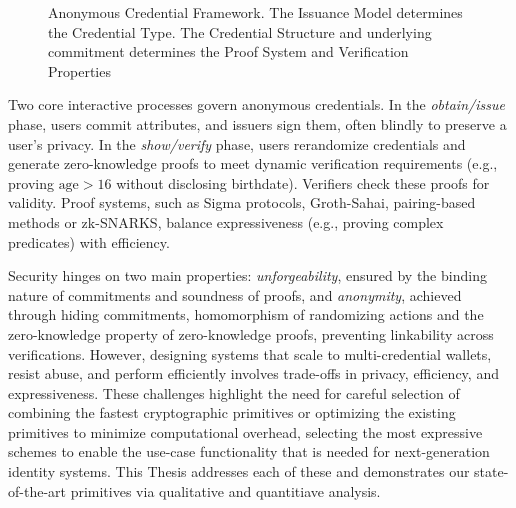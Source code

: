 \begin{figure}
        
  
    \caption[Anonymous Credential Framework Diagram]{Anonymous Credential Framework. The Issuance Model determines the Credential Type. The Credential Structure and underlying commitment determines the Proof System and Verification Properties}
    \label{fig:chap1_anon_cred_framework}
\end{figure}



Two core interactive processes govern anonymous credentials. In the \emph{obtain/issue} phase, users commit attributes, and issuers sign them, often blindly to preserve a user's privacy. In the \emph{show/verify} phase, users rerandomize credentials and generate zero-knowledge proofs to meet dynamic verification requirements (e.g., proving $ \text{age} > 16 $ without disclosing birthdate). Verifiers check these proofs for validity. Proof systems, such as Sigma protocols, Groth-Sahai, pairing-based methods or zk-SNARKS, balance expressiveness (e.g., proving complex predicates) with efficiency.


Security hinges on two main properties: \emph{unforgeability}, ensured by the binding nature of commitments and soundness of proofs, and \emph{anonymity}, achieved through hiding commitments, homomorphism of randomizing actions and the zero-knowledge property of zero-knowledge proofs, preventing linkability across verifications. However, designing systems that scale to multi-credential wallets, resist abuse, and perform efficiently involves trade-offs in privacy, efficiency, and expressiveness. These challenges highlight the need for careful selection of combining the fastest cryptographic primitives or optimizing the existing primitives to minimize computational overhead, selecting the most expressive schemes to enable the use-case functionality that is needed for next-generation identity systems.
This Thesis addresses each of these and demonstrates our state-of-the-art primitives via qualitative and quantitiave analysis. 


